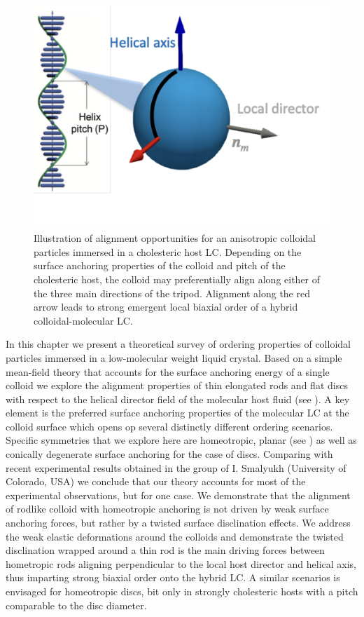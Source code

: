 \begin{figure}
	\includegraphics[width = 0.6 \columnwidth]{figures/chapter-3/tripod}
	\caption[Illustration of alignment opportunities for an anisotropic colloidal particles immersed in a cholesteric host LC.]{ Illustration of alignment opportunities for an anisotropic colloidal particles immersed in a cholesteric host LC. Depending on the surface anchoring properties of the colloid  and pitch of the cholesteric host, the colloid may  preferentially  align along either of the three main directions of the tripod.   Alignment along the red arrow leads to strong emergent local biaxial order of a hybrid colloidal-molecular LC.  }
	\label{tripod}
\end{figure}



In this chapter we present a theoretical survey of ordering properties of colloidal particles immersed in a low-molecular weight liquid crystal. Based on a simple mean-field theory that accounts for the surface anchoring energy of a single colloid we explore the alignment properties of thin elongated rods and flat discs with respect to the helical director field of the molecular host fluid 
(see ).  A key element is the preferred surface anchoring  properties of the molecular LC at the colloid surface which opens op several distinctly different ordering scenarios. Specific symmetries  that we explore  here are homeotropic, planar (see ) as well as conically degenerate surface anchoring for the case of discs.   Comparing with recent experimental results obtained in the group of I. Smalyukh (University of  Colorado, USA) we conclude that our theory accounts for most of the experimental observations, but for one case. We demonstrate that the alignment of rodlike colloid with homeotropic anchoring is not  driven by weak surface anchoring forces, but rather by a twisted surface disclination effects.  We address the weak elastic deformations around the colloids and demonstrate the twisted disclination wrapped around a thin rod  is the main driving forces between hometropic rods aligning perpendicular to the local host director and helical axis, thus imparting strong biaxial order onto the hybrid LC. A similar scenarios is envisaged for homeotropic discs, bit only in strongly cholesteric hosts with a pitch comparable to the disc diameter.




